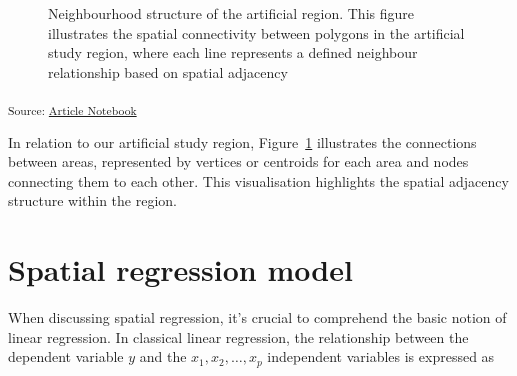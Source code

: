 \documentclass[
  default,
]{sn-jnl}
\begin{document}
\label{cell-fig-neighartfreg}
\begin{figure}[H]


\caption{\label{fig-neighartfreg}Neighbourhood structure of the
artificial region. This figure illustrates the spatial connectivity
between polygons in the artificial study region, where each line
represents a defined neighbour relationship based on spatial adjacency}

\end{figure}%

\textsubscript{Source:
\href{https://indiraputeri-phd.github.io/CAR_simcomp/manuscript.qmd.html}{Article
Notebook}}

In relation to our artificial study region,
Figure~\ref{fig-neighartfreg} illustrates the connections between areas,
represented by vertices or centroids for each area and nodes connecting
them to each other. This visualisation highlights the spatial adjacency
structure within the region.

\section{Spatial regression model}\label{spatial-regression-model}

When discussing spatial regression, it's crucial to comprehend the basic
notion of linear regression. In classical linear regression, the
relationship between the dependent variable \(y\) and the
\(x_1,x_2, \dots, x_p\) independent variables is expressed as
\end{document}
